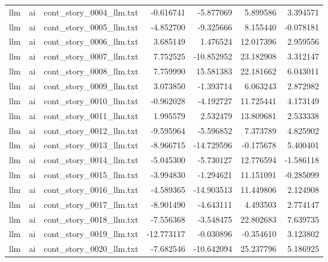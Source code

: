 \begin{longtable}{lllrrrr}
llm & ai & cont\_story\_0004\_llm.txt & -0.616741 & -5.877069 & 5.899586 & 3.394571 \\
llm & ai & cont\_story\_0005\_llm.txt & -4.852700 & -9.325666 & 8.155440 & -0.078181 \\
llm & ai & cont\_story\_0006\_llm.txt & 3.685149 & 1.476524 & 12.017396 & 2.959556 \\
llm & ai & cont\_story\_0007\_llm.txt & 7.752525 & -10.852952 & 23.182908 & 3.312147 \\
llm & ai & cont\_story\_0008\_llm.txt & 7.759990 & 15.581383 & 22.181662 & 6.043011 \\
llm & ai & cont\_story\_0009\_llm.txt & 3.073850 & -1.393714 & 6.063243 & 2.872982 \\
llm & ai & cont\_story\_0010\_llm.txt & -0.962028 & -4.192727 & 11.725441 & 4.173149 \\
llm & ai & cont\_story\_0011\_llm.txt & 1.995579 & 2.532479 & 13.809681 & 2.533338 \\
llm & ai & cont\_story\_0012\_llm.txt & -9.595964 & -5.596852 & 7.373789 & 4.825902 \\
llm & ai & cont\_story\_0013\_llm.txt & -8.966715 & -14.729596 & -0.175678 & 5.400401 \\
llm & ai & cont\_story\_0014\_llm.txt & -5.045300 & -5.730127 & 12.776594 & -1.586118 \\
llm & ai & cont\_story\_0015\_llm.txt & -3.994830 & -1.294621 & 11.151091 & -0.285099 \\
llm & ai & cont\_story\_0016\_llm.txt & -4.589365 & -14.903513 & 11.449806 & 2.124908 \\
llm & ai & cont\_story\_0017\_llm.txt & -8.901490 & -4.643111 & 4.493503 & 2.774147 \\
llm & ai & cont\_story\_0018\_llm.txt & -7.556368 & -3.548475 & 22.802683 & 7.639735 \\
llm & ai & cont\_story\_0019\_llm.txt & -12.773117 & -0.030896 & -0.354610 & 3.123802 \\
llm & ai & cont\_story\_0020\_llm.txt & -7.682546 & -10.642094 & 25.237796 & 5.186925 \\
\end{longtable}
